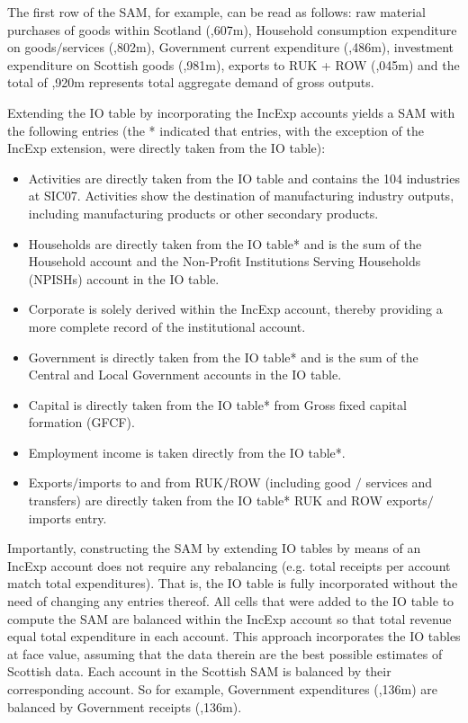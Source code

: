 The first row of the SAM, for example, can be read as follows: raw material purchases of goods within Scotland (,607m), Household consumption expenditure on goods$/$services (,802m), Government current expenditure (,486m), investment expenditure on Scottish goods (,981m), exports to RUK + ROW (,045m) and the total of ,920m represents total aggregate demand of gross outputs.

\bigskip

Extending the IO table by incorporating the IncExp accounts yields a SAM with the following entries (the * indicated that entries, with the exception of the IncExp extension, were directly taken from the IO table):

\bigskip

\begin{itemize}
    \item Activities are directly taken from the IO table and contains the 104 industries at SIC07. Activities show the destination of manufacturing industry outputs, including manufacturing products or other secondary products.
    \item Households are directly taken from the IO table* and is the sum of the Household account and the Non-Profit Institutions Serving Households (NPISHs) account in the IO table.
    \item Corporate is solely derived within the IncExp account, thereby providing a more complete record of the institutional account.
    \item Government is directly taken from the IO table* and is the sum of the Central and Local Government accounts in the IO table.
    \item Capital is directly taken from the IO table* from Gross fixed capital formation (GFCF).
    \item Employment income is taken directly from the IO table*.
    \item Exports$/$imports to and from RUK$/$ROW (including good $/$ services and transfers) are directly taken from the IO table* RUK and ROW exports$/$imports entry.
\end{itemize}

\bigskip

Importantly, constructing the SAM by extending IO tables by means of an IncExp account does not require any rebalancing (e.g. total receipts per account match total expenditures). That is, the IO table is fully incorporated without the need of changing any entries thereof. All cells that were added to the IO table to compute the SAM are balanced within the IncExp account so that total revenue equal total expenditure in each account. This approach incorporates the IO tables at face value, assuming that the data therein are the best possible estimates of Scottish data. Each account in the Scottish SAM is balanced by their corresponding account. So for example, Government expenditures (,136m) are balanced by Government receipts (,136m).

